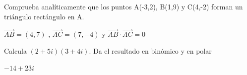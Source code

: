 \documentclass[addpoints,spanish, 12pt,a4paper]{exam}
\begin{document}
\begin{questions}

\question[2]  Comprueba analíticamente que los puntos A(-3,2), B(1,9) y C(4,-2) forman un triángulo rectángulo en A.
\begin{solution}
    $\vec{AB}=(4,7)$ , $\vec{AC}=(7,-4)$ y $\vec{AB}\cdot\vec{AC}=0$
\end{solution}






\question[2] Calcula $(2+5i) (3+4i)$. Da el resultado en binómico y en polar
\begin{solution}
    $-14+23i$
\end{solution}

\end{questions}
\end{document}
